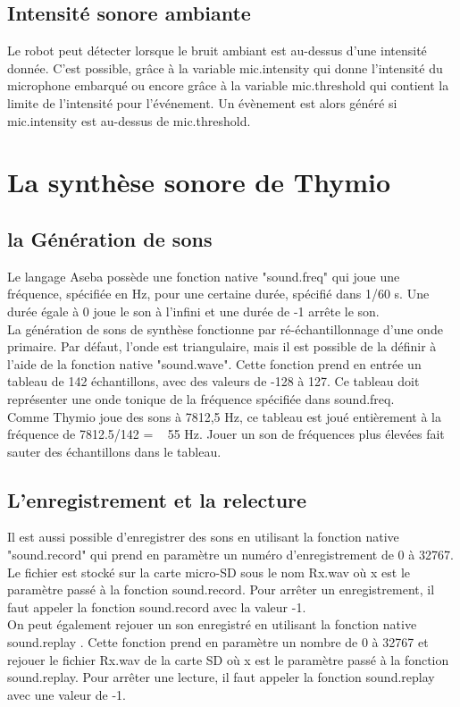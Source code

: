 \documentclass[a4paper, 12pt]{report}
\begin{document}
\subsection{Intensité sonore ambiante}
Le robot peut détecter lorsque le bruit ambiant est au-dessus d'une intensité donnée. C'est possible, grâce à la variable mic.intensity qui donne l'intensité du microphone embarqué ou encore grâce à la variable mic.threshold qui contient la limite de l'intensité pour l'événement. Un évènement est alors généré si mic.intensity est au-dessus de mic.threshold.\\

\section{La synthèse sonore de Thymio}
\subsection{la Génération de sons}
Le langage Aseba possède une fonction native "sound.freq" qui joue une fréquence, spécifiée en Hz, pour une certaine durée, spécifié dans 1/60 s. Une durée égale à 0 joue le son à l'infini et une durée de -1 arrête le son.\\
La génération de sons de synthèse fonctionne par ré-échantillonnage d'une onde primaire. Par défaut, l'onde est triangulaire, mais il est possible de la	définir à l'aide de la fonction native "sound.wave". Cette fonction prend en entrée un tableau de 142 échantillons, avec des valeurs de -128 à 127. Ce tableau doit représenter une onde tonique de la fréquence spécifiée dans sound.freq.\\
 Comme Thymio joue des sons à 7812,5 Hz, ce tableau est joué entièrement à la fréquence de 7812.5/142 = ~ 55 Hz. Jouer un son de fréquences plus élevées fait sauter des échantillons dans le tableau.

\subsection{L'enregistrement et la relecture}
Il est aussi possible d'enregistrer des sons en utilisant la fonction native "sound.record" qui prend en paramètre un numéro d'enregistrement de 0 à 32767. Le fichier est stocké sur la carte micro-SD sous le nom Rx.wav où x est le paramètre passé à la fonction sound.record. Pour arrêter un enregistrement, il faut appeler la fonction sound.record avec la valeur -1.\\
On peut également rejouer un son enregistré en utilisant la fonction native sound.replay . Cette fonction prend en paramètre un nombre de 0 à 32767 et rejouer le fichier Rx.wav de la carte SD où x est le paramètre passé à la fonction sound.replay. Pour arrêter une lecture, il faut appeler la fonction sound.replay avec une valeur de -1.
\end{document}
